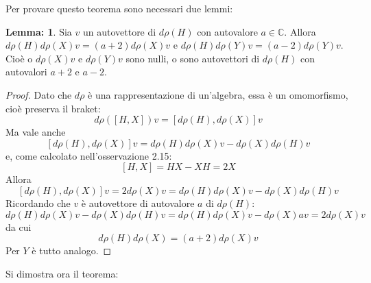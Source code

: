 \documentclass[12pt,a4paper]{report}
\theoremstyle{definition}
\theoremstyle{definition}
\theoremstyle{definition}
\newtheorem{Lem}[Def]{Lemma:}
\theoremstyle{remark}
\begin{document}
Per provare questo teorema sono necessari due lemmi:
\begin{Lem}\label{Lemma1}
	Sia $v$ un autovettore di $d\rho(H)$ con autovalore $a\in\mathbb{C}$. Allora $d\rho(H)d\rho(X)v=(a+2)d\rho(X)v$ e $d\rho(H)d\rho(Y)v=(a-2)d\rho(Y)v$. Cioè o $d\rho(X)v$ e $d\rho(Y)v$ sono nulli, o sono autovettori di $d\rho(H)$ con autovalori $a+2$ e $a-2$.
\end{Lem}
\begin{proof}
	Dato che $d\rho$ è una rappresentazione di un'algebra, essa è un omomorfismo, cioè preserva il braket:\\ $$d\rho([H,X])v=[d\rho(H),d\rho(X)]v$$
	Ma vale anche $$[d\rho(H),d\rho(X)]v=d\rho(H)d\rho(X)v-d\rho(X)d\rho(H)v$$ e, come calcolato nell'osservazione 2.15: $$[H,X]=HX-XH=2X$$ 
	Allora $$[d\rho(H),d\rho(X)]v=2d\rho(X)v=d\rho(H)d\rho(X)v-d\rho(X)d\rho(H)v$$ 
	Ricordando che $v$ è autovettore di autovalore $a$ di $d\rho(H)$:
	$$d\rho(H)d\rho(X)v-d\rho(X)d\rho(H)v=d\rho(H)d\rho(X)v-d\rho(X)av=2d\rho(X)v$$ da cui
	$$d\rho(H)d\rho(X)=(a+2)d\rho(X)v$$ 
	Per $Y$ è tutto analogo.
\end{proof}
Si dimostra ora il teorema:
\end{document}

